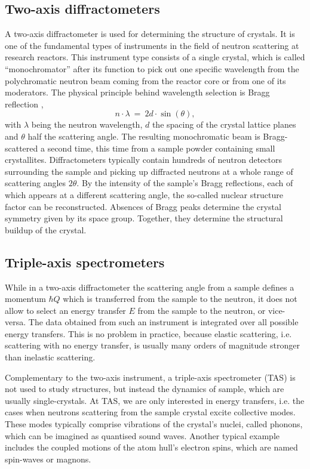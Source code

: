 \subsection{Two-axis diffractometers}

A two-axis diffractometer is used for determining the structure of crystals. It is one of the fundamental types of instruments in the field of neutron scattering at research reactors. This instrument type consists of a single crystal, which is called ``monochromator'' after its function to pick out one specific wavelength from the polychromatic neutron beam coming from the reactor core or from one of its moderators. The physical principle behind wavelength selection is Bragg reflection \cite[p. 68]{Gross2012}, 
\begin{equation}
	n \cdot \lambda \ =\  2 d \cdot \sin\left(\theta\right),
\end{equation}
with $\lambda$ being the neutron wavelength, $d$ the spacing of the crystal lattice planes and $\theta$ half the scattering angle.
The resulting monochromatic beam is Bragg-scattered a second time, this time from a sample powder containing small crystallites. Diffractometers typically contain hundreds of neutron detectors surrounding the sample and picking up diffracted neutrons at a whole range of scattering angles $2 \theta$. By the intensity of the sample's Bragg reflections, each of which appears at a different scattering angle, the so-called nuclear structure factor can be reconstructed. Absences of Bragg peaks determine the crystal symmetry given by its space group. Together, they determine the structural buildup of the crystal.


\subsection{Triple-axis spectrometers}

While in a two-axis diffractometer the scattering angle from a sample defines a momentum $\hbar Q$ which is transferred from the sample to the neutron, it does not allow to select an energy transfer $E$ from the sample to the neutron, or vice-versa. The data obtained from such an instrument is integrated over all possible energy transfers. This is no problem in practice, because elastic scattering, i.e. scattering with no energy transfer, is usually many orders of magnitude stronger than inelastic scattering.

Complementary to the two-axis instrument, a triple-axis spectrometer (TAS) is not used to study structures, but instead the dynamics of sample, which are usually single-crystals. At TAS, we are only interested in energy transfers, i.e. the cases when neutrons scattering from the sample crystal excite collective modes. These modes typically comprise vibrations of the crystal's nuclei, called phonons, which can be imagined as quantised sound waves. Another typical example includes the coupled motions of the atom hull's electron spins, which are named spin-waves or magnons.

